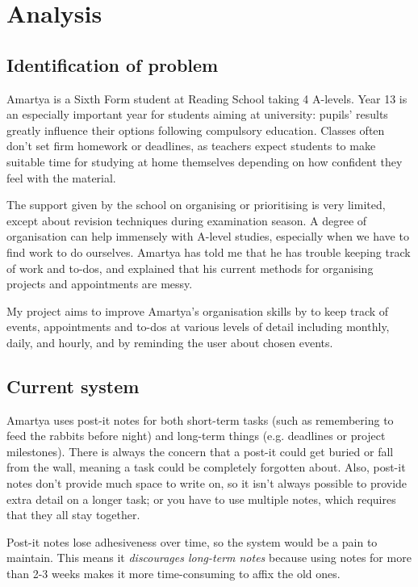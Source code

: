 \section{Analysis}

\subsection{Identification of problem}

Amartya is a Sixth Form student at Reading School taking 4 A-levels.
Year 13 is an especially important year for students aiming at university:
pupils' results greatly influence their options following compulsory
education. Classes often don't set firm homework or deadlines, as teachers
expect students to make suitable time for studying at home themselves depending
on how confident they feel with the material.

The support given by the school on organising or prioritising is very limited,
except about revision techniques during examination season. A degree of
organisation can help immensely with A-level studies, especially when we have to
find work to do ourselves. Amartya has told me that he has trouble keeping track
of work and to-dos, and explained that his current methods for organising
projects and appointments are messy.

My project aims to improve Amartya's organisation skills by  to keep track of events, appointments and
to-dos at various levels of detail including monthly, daily, and hourly, and by
reminding the user about chosen events.


\subsection{Current system}

Amartya uses post-it notes for both short-term tasks (such as remembering to
feed the rabbits before night) and long-term things (e.g. deadlines or project
milestones). There is always the concern that a post-it could get buried or fall
from the wall, meaning a task could be completely forgotten about. Also, post-it
notes don't provide much space to write on, so it isn't always possible to
provide extra detail on a longer task; or you have to use multiple notes, which
requires that they all stay together.

Post-it notes lose adhesiveness over time, so the system would be a pain to
maintain. This means it \textit{discourages long-term notes} because using notes
for more than 2-3 weeks makes it more time-consuming to affix the old ones.

